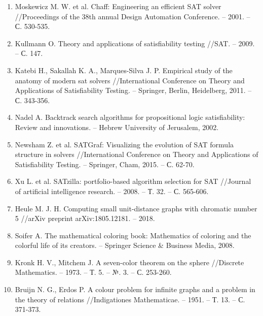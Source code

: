 \begin{enumerate}[leftmargin=0.5cm,topsep=0pt,itemsep=-1ex,partopsep=1ex,parsep=1ex,ref=\arabic{*},label=\arabic{*}.]
\item\label{bib:Moskewicz}
Moskewicz M. W. et al. Chaff: Engineering an efficient SAT solver //Procee\-dings of the 38th annual Design Automation Conference. – 2001. – С. 530-535.

\item\label{bib:Kullmann2009}
Kullmann O. Theory and applications of satisfiability testing //SAT. – 2009. – С. 147.

\item\label{bib:Katebi}
Katebi H., Sakallah K. A., Marques-Silva J. P. Empirical study of the ana\-to\-my of modern sat solvers //International Conference on Theory and Applica\-ti\-ons of Satisfiability Testing. – Springer, Berlin, Heidelberg, 2011. – С. 343-356.

\item\label{bib:Nadel2002}
Nadel A. Backtrack search algorithms for propositional logic satisfiability: Review and innovations. – Hebrew University of Jerusalem, 2002.

\item\label{bib:Newsham}
Newsham Z. et al. SATGraf: Visualizing the evolution of SAT formula struc\-tu\-re in solvers //International Conference on Theory and Applications of Satisfiabi\-li\-ty Testing. – Springer, Cham, 2015. – С. 62-70.

\item\label{bib:SATzilla}
Xu L. et al. SATzilla: portfolio-based algorithm selection for SAT //Journal of artificial intelligence research. – 2008. – Т. 32. – С. 565-606.

\item\label{bib:Heule2018}
Heule M. J. H. Computing small unit-distance graphs with chromatic number 5 //arXiv preprint arXiv:1805.12181. – 2018.

\item\label{bib:Soifer}
Soifer A. The mathematical coloring book: Mathematics of coloring and the colorful life of its creators. – Springer Science \& Business Media, 2008.

\item\label{bib:Kronk}
Kronk H. V., Mitchem J. A seven-color theorem on the sphere //Discrete Mathematics. – 1973. – Т. 5. – №. 3. – С. 253-260.

\item\label{bib:BruijnErdos}
Bruijn N. G., Erdos P. A colour problem for infinite graphs and a problem in the theory of relations //Indigationes Mathematicae. – 1951. – Т. 13. – С. 371-373.


\end{enumerate}
